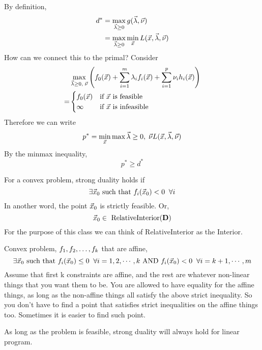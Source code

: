 \begin{remark}
	By definition,
\begin{align*}
	d^* &= \max_{\vec{\lambda}\ge0}g(\vec{\lambda},\vec{\nu})\\
	&= \max_{\vec{\lambda}\ge0} \min_{\vec{x}} L(\vec{x},\vec{\lambda},\vec{\nu})
\end{align*}
How can we connect this to the primal? Consider
\begin{align*}
	&\max_{\vec{\lambda}\ge0,\;\vec{\nu}} \left(f_0(\vec{x})+\sum_{i=1}^m \lambda_if_i(\vec{x})+\sum_{i=1}^p\nu_ih_i(\vec{x})\right)\\
	=&\begin{cases}
		f_0(\vec{x}) & \text{if }\vec{x} \text{ is feasible}\\
		\infty& \text{if }\vec{x} \text{ is infeasible}
	\end{cases}
\end{align*}
Therefore we can write
\[
p^* = \min_{\vec{x}}\max{\vec{\lambda}\ge0,\;\vec{\nu}} L(\vec{x}, \vec{\lambda}, \vec{\nu})
\]
By the minmax inequality,
\[
p^* \ge d^*
\]
\end{remark}

\begin{theorem}
	For a convex problem, strong duality holds if 
	\[
\exists \vec{x}_0 \text{ such that } f_i(\vec{x}_0) < 0 \;\;\forall i
	\]
	In another word, the point $\vec{x}_0$ is strictly feasible. Or,
	\[
\vec{x}_0 \in \text{ RelativeInterior}(\mathbf{D})
	\]
	For the purpose of this class we can think of RelativeInterior as the Interior.
\end{theorem}

\begin{theorem}
	Convex problem, ${f}_1,{f}_2, \ldots, {f}_{k}$ that are affine,
	\[
\exists \vec{x}_0 \text{ such that } f_i(\vec{x}_0) \le 0 \;\;\forall i = 1, 2, \cdots, k \text{ AND } f_i(\vec{x}_0) < 0\;\;\forall i = k+1,\cdots, m
	\]
	Assume that first k constraints are affine, and the rest are whatever non-linear things that you want them to be. You are allowed to have equality for the affine things, as long as the non-affine things all satisfy the above strict inequality. So you don't have to find a point that satisfies strict inequalities on the affine things too. Sometimes it is easier to find such point.
\end{theorem}

\begin{remark}
	As long as the problem is feasible, strong duality will always hold for linear program.
\end{remark}

